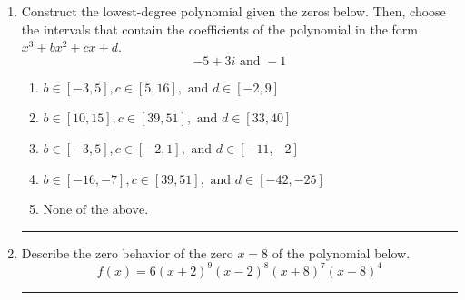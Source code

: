 \documentclass[14pt]{extbook}
\newcommand{\litem}[1]{\item#1\hspace*{-1cm}\rule{\textwidth}{0.4pt}}
\begin{document}
\begin{enumerate}
\litem{
Construct the lowest-degree polynomial given the zeros below. Then, choose the intervals that contain the coefficients of the polynomial in the form $x^3+bx^2+cx+d$.\[ -5 + 3 i \text{ and } -1 \]\begin{enumerate}[label=\Alph*.]
\item \( b \in [-3, 5], c \in [5, 16], \text{ and } d \in [-2, 9] \)
\item \( b \in [10, 15], c \in [39, 51], \text{ and } d \in [33, 40] \)
\item \( b \in [-3, 5], c \in [-2, 1], \text{ and } d \in [-11, -2] \)
\item \( b \in [-16, -7], c \in [39, 51], \text{ and } d \in [-42, -25] \)
\item \( \text{None of the above.} \)

\end{enumerate} }
\litem{
Describe the zero behavior of the zero $x = 8$ of the polynomial below.\[ f(x) = 6(x + 2)^{9}(x - 2)^{8}(x + 8)^{7}(x - 8)^{4} \]\begin{enumerate}[label=\Alph*.]

\end{enumerate}}
\end{enumerate}
\end{document}

